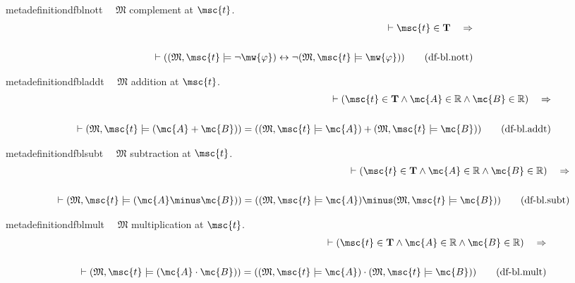 \begin{restatable}{metadefinition}{dfblnott}~~ $\mathfrak{M}$ complement at
$\msc{t}$.
\begin{align}
\vdash \msc{t} \in \mathbf{T}\quad\Rightarrow \notag \\ 
	 \notag \\ 
	\quad \vdash ( ( \mathfrak{M} ,
    \msc{t} \models \lnot \mw{\varphi} ) \leftrightarrow \lnot ( \mathfrak{M} ,
    \msc{t} \models \mw{\varphi} ) )\label{eq:df-bl.nott}\tag{df-bl.nott}
\end{align}
\end{restatable}

\begin{restatable}{metadefinition}{dfbladdt}~~ $\mathfrak{M}$ addition at $\msc{t}$.
\begin{align}
\vdash ( \msc{t} \in \mathbf{T} \wedge \mc{A} \in \mathbb{R} \wedge \mc{B} \in
    \mathbb{R} )\quad\Rightarrow \notag \\ 
	 \notag \\ 
	\quad \vdash ( \mathfrak{M} , \msc{t} \models (
    \mc{A} + \mc{B} ) ) = ( ( \mathfrak{M} , \msc{t} \models \mc{A} ) + (
    \mathfrak{M} , \msc{t} \models \mc{B} )
    )\label{eq:df-bl.addt}\tag{df-bl.addt}
\end{align}
\end{restatable}

\begin{restatable}{metadefinition}{dfblsubt}~~ $\mathfrak{M}$ subtraction at
$\msc{t}$.
\begin{align}
\vdash ( \msc{t} \in \mathbf{T} \wedge \mc{A} \in \mathbb{R} \wedge \mc{B} \in
    \mathbb{R} )\quad\Rightarrow \notag \\ 
	 \notag \\ 
	\quad \vdash ( \mathfrak{M} , \msc{t} \models (
    \mc{A} \minus \mc{B} ) ) = ( ( \mathfrak{M} , \msc{t} \models \mc{A} )
    \minus ( \mathfrak{M} , \msc{t} \models \mc{B} )
    )\label{eq:df-bl.subt}\tag{df-bl.subt}
\end{align}
\end{restatable}

\begin{restatable}{metadefinition}{dfblmult}~~ $\mathfrak{M}$ multiplication at
$\msc{t}$.
\begin{align}
\vdash ( \msc{t} \in \mathbf{T} \wedge \mc{A} \in \mathbb{R} \wedge \mc{B} \in
    \mathbb{R} )\quad\Rightarrow \notag \\ 
	 \notag \\ 
	\quad \vdash ( \mathfrak{M} , \msc{t} \models (
    \mc{A} \cdot \mc{B} ) ) = ( ( \mathfrak{M} , \msc{t} \models \mc{A} ) \cdot
    ( \mathfrak{M} , \msc{t} \models \mc{B} )
    )\label{eq:df-bl.mult}\tag{df-bl.mult}
\end{align}
\end{restatable}

